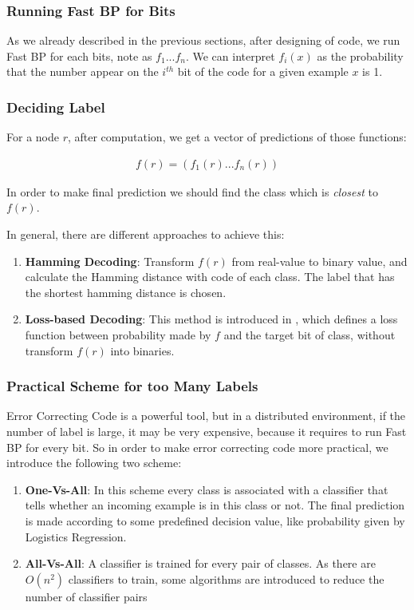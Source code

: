 \subsubsection*{Running Fast BP for Bits}

As we already described in the previous sections, after designing of code, we run Fast BP for each bits, note as $f_{1}...f_{n}$. We can interpret $f_{i}(x)$ as the probability that the number appear on the $i^{th}$ bit of the code for a given example $x$ is 1.

\subsubsection*{Deciding Label}

For a node $r$, after computation, we get a vector of predictions of those functions:

\begin{gather*}
	f(r) = (f_{1}(r)...f_{n}(r)) 
\end{gather*}



In order to make final prediction we should find the class which is \textit{closest} to $f(r)$.

In general, there are different approaches to achieve this:

\begin{enumerate}
	\item \textbf{Hamming Decoding}: Transform $f(r)$ from real-value to binary value, and calculate the Hamming distance with code of each class. The label that has the shortest hamming distance is chosen.
	\item \textbf{Loss-based Decoding}: This method is introduced in \cite{Erin2000}, which defines a loss function between probability made by $f$ and the target bit of class, without transform $f(r)$ into binaries.
\end{enumerate}

\subsubsection*{Practical Scheme for too Many Labels}

Error Correcting Code is a powerful tool, but in a distributed environment, if the number of label is large, it may be very expensive, because it requires to run Fast BP for every bit. So in order to make error correcting code more practical, we introduce the following two scheme:

\begin{enumerate}
	\item \textbf{One-Vs-All}: In this scheme every class is associated with a classifier that tells whether an incoming example is in this class or not. The final prediction is made according to some predefined decision value, like probability given by Logistics Regression.
	\item \textbf{All-Vs-All}: A classifier is trained for every pair of classes. As there are $O(n^{2})$ classifiers to train, some algorithms are introduced to reduce the number of classifier pairs\cite{Platt2000}
\end{enumerate}

